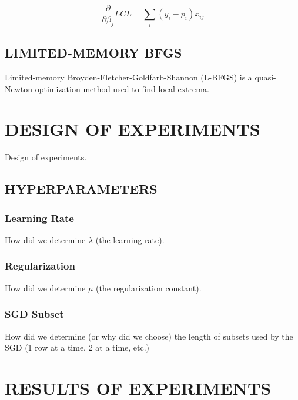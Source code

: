 \begin{equation}
    \frac{\partial}{\partial \beta_j} LCL = \sum_i (y_i - p_i)x_{ij}
\end{equation}


\subsection{LIMITED-MEMORY BFGS}
Limited-memory Broyden-Fletcher-Goldfarb-Shannon (L-BFGS) is a quasi-Newton
optimization method used to find local extrema.



\section{DESIGN OF EXPERIMENTS}
\label{sec:experiments}

Design of experiments.

\subsection{HYPERPARAMETERS}

\subsubsection{Learning Rate}
How did we determine $\lambda$ (the learning rate).

\subsubsection{Regularization}
How did we determine $\mu$ (the regularization constant).

\subsubsection{SGD Subset}
How did we determine (or why did we choose) the length of subsets used by the SGD (1 row at a time, 2 at a time, etc.)



\section{RESULTS OF EXPERIMENTS}
\label{sec:results}


